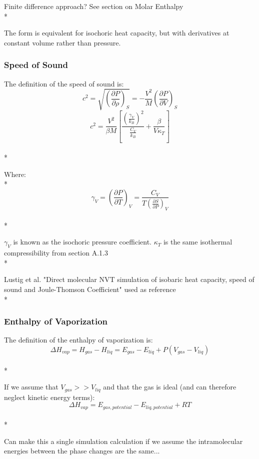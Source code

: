 \documentclass[a4paper,12pt]{article}
\begin{document}
Finite difference approach? See section on Molar Enthalpy\\*

The form is equivalent for isochoric heat capacity, but with derivatives at constant volume rather than pressure.

\subsubsection{Speed of Sound}
The definition of the speed of sound is:
\begin{equation}c^2 = \sqrt{\left(\frac{\partial P}{\partial \rho}\right)_{S}} = -\frac{V^2}{M}\left(\frac{\partial P}{\partial V}\right)_{S}\end{equation}
\begin{equation}c^2 = \frac{V^2}{\beta M}\left[\frac{\left(\frac{\gamma_V}{k_B}\right)^2}{\frac{C_V}{k_B}} + \frac{\beta}{V \kappa_T}\right]\end{equation}\\*

Where:\\*
\begin{equation}\gamma_V = \left(\frac{\partial P}{\partial T}\right)_{V} = \frac{C_V}{T \left(\frac{\partial S}{\partial P}\right)_{V}}\end{equation}\\*

$\gamma_V$ is known as the isochoric pressure coefficient. $\kappa_T$ is the same isothermal compressibility from section A.1.3\\*

Lustig et al. "Direct molecular NVT simulation of isobaric heat capacity, speed of sound and Joule-Thomson Coefficient" used as reference\\*


\subsubsection{Enthalpy of Vaporization}
The definition of the enthalpy of vaporization is:
\begin{equation}\Delta H_{vap} = H_{gas} - H_{liq} = E_{gas} - E_{liq} + P(V_{gas} - V_{liq})\end{equation}\\*

If we assume that $V_{gas} >> V_{liq}$ and that the gas is ideal (and can therefore neglect kinetic energy terms):
\begin{equation}\Delta H_{vap} = E_{gas, potential} - E_{liq, potential} + R T\end{equation}\\*

Can make this a single simulation calculation if we assume the intramolecular energies between the phase changes are the same...
\end{document}
